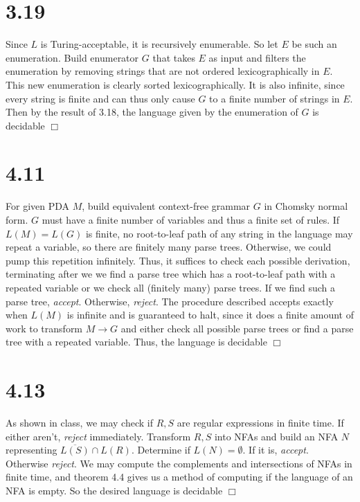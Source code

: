 \documentclass{article}
\begin{document}
\section*{3.19}
Since $L$ is Turing-acceptable, it is recursively enumerable. So let $E$ be such an enumeration. Build enumerator $G$ that takes $E$ as input and filters the enumeration by removing strings that are not ordered lexicographically in $E$. This new enumeration is clearly sorted lexicographically. It is also infinite, since every string is finite and can thus only cause $G$ to  a finite number of strings in $E$. Then by the result of 3.18, the language given by the enumeration of $G$ is decidable $\Box$

\section*{4.11}
For given PDA $M$, build equivalent context-free grammar $G$ in Chomsky normal form. $G$ must have a finite number of variables and thus a finite set of rules. If $L(M) = L(G)$ is finite, no root-to-leaf path of any string in the language may repeat a variable, so there are finitely many parse trees. Otherwise, we could pump this repetition infinitely. Thus, it suffices to check each possible derivation, terminating after we we find a parse tree which has a root-to-leaf path with a repeated variable or we check all (finitely many) parse trees. If we find such a parse tree, \textit{accept}. Otherwise, \textit{reject}. The procedure described accepts exactly when $L(M)$ is infinite and is guaranteed to halt, since it does a finite amount of work to transform $M \to G$ and either check all possible parse trees or find a parse tree with a repeated variable. Thus, the language is decidable $\Box$

\section*{4.13}
As shown in class, we may check if $R,S$ are regular expressions in finite time. If either aren't, \textit{reject} immediately. Transform $R,S$ into NFAs and build an NFA $N$ representing $\overline{L(S)} \cap L(R)$. Determine if $L(N) = \emptyset$. If it is, \textit{accept}. Otherwise \textit{reject}. We may compute the complements and intersections of NFAs in finite time, and theorem 4.4 gives us a method of computing if the language of an NFA is empty. So the desired language is decidable $\Box$
\end{document}
